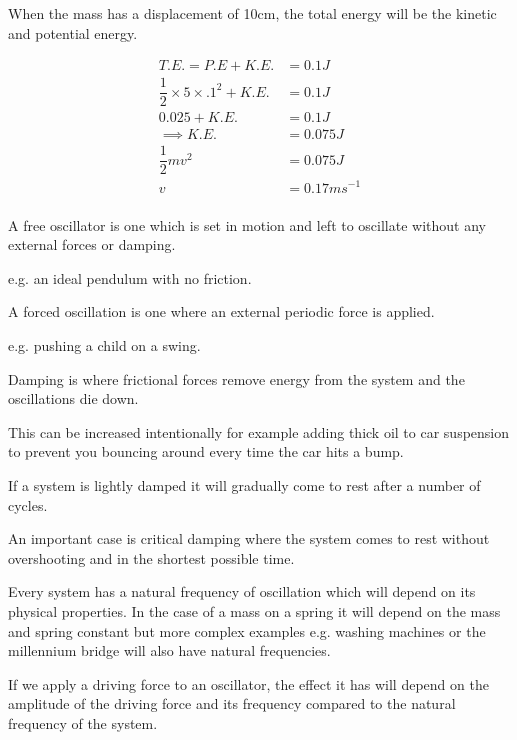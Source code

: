 \documentclass[revision-guide.tex]{subfiles}
\begin{document}
When the mass has a displacement of 10cm, the total energy will be the kinetic and potential energy.


\begin{align*} 
T.E. = P.E + K.E. &= 0.1J \\
 \dfrac{1}{2} \times 5 \times .1^2 + K.E. &= 0.1J\\
 0.025 + K.E. &= 0.1J  \\
 \implies K.E. &= 0.075J \\
 \dfrac{1}{2}mv^2 &= 0.075J \\
 v &= 0.17 ms^{-1} \\
 \end{align*}



\pagebreak


A free oscillator is one which is set in motion and left to oscillate without any external forces or damping.

e.g. an ideal pendulum with no friction.

A forced oscillation is one where an external periodic force is applied. 

e.g. pushing a child on a swing.

Damping is where frictional forces remove energy from the system and the oscillations die down.

This can be increased intentionally for example adding thick oil to car suspension to prevent you bouncing around every time the car hits a bump.

If a system is lightly damped it will gradually come to rest after a number of cycles. 

An important case is critical damping where the system comes to rest without overshooting and in the shortest possible time. 

 


Every system has a natural frequency of oscillation which will depend on its physical properties. In the case of a mass on a spring it will depend on the mass and spring constant but more complex examples e.g. washing machines or the millennium bridge will also have natural frequencies.

If we apply a driving force to an oscillator, the effect it has will depend on the amplitude of the driving force and its frequency compared to the natural frequency of the system. 
\end{document}
